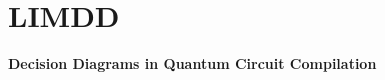 \section{LIMDD}


\begin{frame}[noframenumbering]
\begin{refsection}

\vfill
	
	\centering
	\textbf{\Large Decision Diagrams in Quantum Circuit Compilation}
	
	
\vfill

\printbibliography[section=\therefsection]
\end{refsection}

\end{frame}







